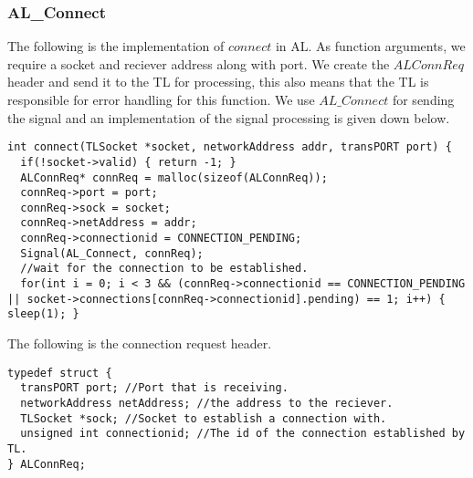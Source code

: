 \subsubsection{AL\_Connect}
The following is the implementation of $connect$ in AL.
As function arguments, we require a socket and reciever address along with port.
We create the $ALConnReq$ header and send it to the TL for processing,
this also means that the TL is responsible for error handling for this function.
We use $AL\_Connect$ for sending the signal and an implementation of the signal processing is given down below.
\begin{lstlisting}
int connect(TLSocket *socket, networkAddress addr, transPORT port) {
  if(!socket->valid) { return -1; }
  ALConnReq* connReq = malloc(sizeof(ALConnReq));
  connReq->port = port;
  connReq->sock = socket;
  connReq->netAddress = addr;
  connReq->connectionid = CONNECTION_PENDING;
  Signal(AL_Connect, connReq);
  //wait for the connection to be established.
  for(int i = 0; i < 3 && (connReq->connectionid == CONNECTION_PENDING || socket->connections[connReq->connectionid].pending) == 1; i++) { sleep(1); }
\end{lstlisting}

The following is the connection request header.
\begin{lstlisting}
typedef struct {
  transPORT port; //Port that is receiving.
  networkAddress netAddress; //the address to the reciever.
  TLSocket *sock; //Socket to establish a connection with.
  unsigned int connectionid; //The id of the connection established by TL.
} ALConnReq;
\end{lstlisting}

